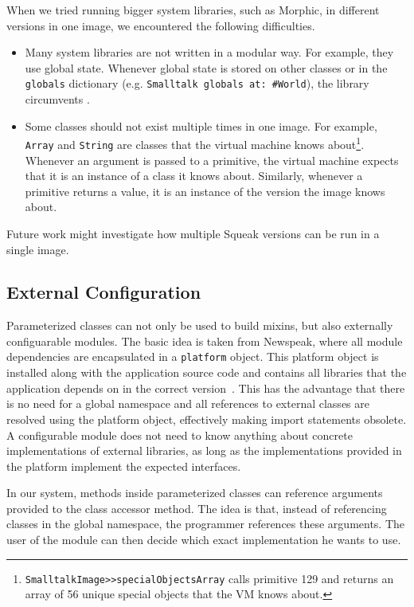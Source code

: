 When we tried running bigger system libraries, such as Morphic, in different versions in one image, we encountered the following difficulties.
\begin{itemize}
    \item Many system libraries are not written in a modular way. For example, they use global state. Whenever global state is stored on other classes or in the \texttt{globals} dictionary (e.g. \texttt{Smalltalk globals at: \#World}), the library circumvents \msname.
    \item Some classes should not exist multiple times in one image. For example, \texttt{Array} and \texttt{String} are classes that the virtual machine knows about\footnote{\texttt{SmalltalkImage>>specialObjectsArray} calls primitive 129 and returns an array of 56 unique special objects that the VM knows about.}. Whenever an argument is passed to a primitive, the virtual machine expects that it is an instance of a class it knows about. Similarly, whenever a primitive returns a value, it is an instance of the version the image knows about.
\end{itemize}

Future work might investigate how multiple Squeak versions can be run in a single image.

\subsection{External Configuration}
Parameterized classes can not only be used to build mixins, but also externally configuarable modules. The basic idea is taken from Newspeak, where all module dependencies are encapsulated in a \texttt{platform} object. This platform object is installed along with the application source code and contains all libraries that the application depends on in the correct version~\cite{bracha2008newspeak}. This has the advantage that there is no need for a global namespace and all references to external classes are resolved using the platform object, effectively making import statements obsolete. A configurable module does not need to know anything about concrete implementations of external libraries, as long as the implementations provided in the platform implement the expected interfaces.

In our system, methods inside parameterized classes can reference arguments provided to the class accessor method. The idea is that, instead of referencing classes in the global namespace, the programmer references these arguments. The user of the module can then decide which exact implementation he wants to use.

